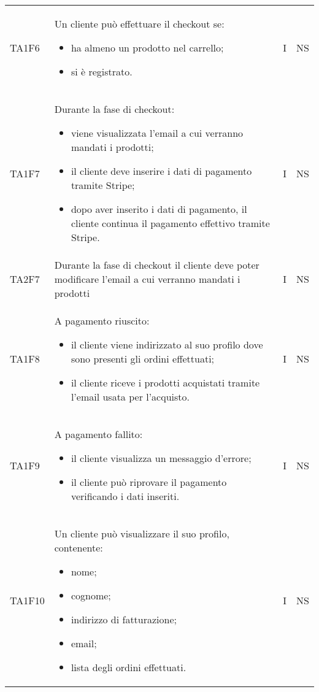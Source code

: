 {\begin{longtable}{C{2cm} C{9.6cm} C{1.5cm} C{1cm}}
TA1F6 & Un cliente può effettuare il checkout se:
\begin{itemize}
	\item ha almeno un prodotto nel carrello;
	\item si è registrato.
\end{itemize}
& I & NS\\

TA1F7 & Durante la fase di checkout:
\begin{itemize}
	\item viene visualizzata l'email a cui verranno mandati i prodotti;
	\item il cliente deve inserire i dati di pagamento tramite Stripe;
	\item dopo aver inserito i dati di pagamento, il cliente continua il pagamento effettivo tramite Stripe.
\end{itemize}
& I & NS\\

TA2F7 & Durante la fase di checkout il cliente deve poter modificare l'email a cui verranno mandati i prodotti
& I & NS\\

TA1F8 & A pagamento riuscito:
\begin{itemize}
	\item il cliente viene indirizzato al suo profilo dove sono presenti gli ordini effettuati;
	\item il cliente riceve i prodotti acquistati tramite l'email usata per l'acquisto.
\end{itemize}
& I & NS\\

TA1F9 & A pagamento fallito:
\begin{itemize}
	\item il cliente visualizza un messaggio d'errore;
	\item il cliente può riprovare il pagamento verificando i dati inseriti.
\end{itemize}
& I & NS\\


TA1F10 & Un cliente può visualizzare il suo profilo, contenente:
\begin{itemize}
	\item nome;
	\item cognome;
	\item indirizzo di fatturazione;
	\item email;
	\item lista degli ordini effettuati.
\end{itemize}
& I & NS\\


\end{longtable}}
